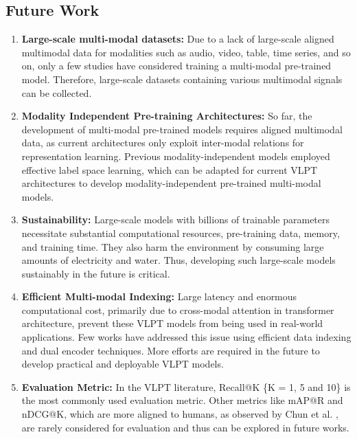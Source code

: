 \subsection{Future Work}
\begin{enumerate}
    \item \textbf{Large-scale multi-modal datasets: } Due to a lack of large-scale aligned multimodal data for modalities such as audio, video, table, time series, and so on, only a few studies have considered training a multi-modal pre-trained model. Therefore, large-scale datasets containing various multimodal signals can be collected.
    \item \textbf{Modality Independent Pre-training Architectures:} So far, the development of multi-modal pre-trained models requires aligned multimodal data, as current architectures only exploit inter-modal relations for representation learning. Previous modality-independent models employed effective label space learning, which can be adapted for current VLPT architectures to develop modality-independent pre-trained multi-modal models.
    \item \textbf{Sustainability:} Large-scale models with billions of trainable parameters necessitate substantial computational resources, pre-training data, memory, and training time. They also harm the environment by consuming large amounts of electricity and water. Thus, developing such large-scale models sustainably in the future is critical.
    \item \textbf{Efficient Multi-modal Indexing:} Large latency and enormous computational cost, primarily due to cross-modal attention in transformer architecture, prevent these VLPT models from being used in real-world applications. Few works have addressed this issue using efficient data indexing and dual encoder techniques. More efforts are required in the future to develop practical and deployable VLPT models.
    \item \textbf{Evaluation Metric:} In the VLPT literature, Recall@K \{K = 1, 5 and 10\} is the most commonly used evaluation metric. Other metrics like mAP@R and nDCG@K, which are more aligned to humans, as observed by Chun et al. \cite{Chun2022ECCVCC}, are rarely considered for evaluation and thus can be explored in future works.
\end{enumerate}

